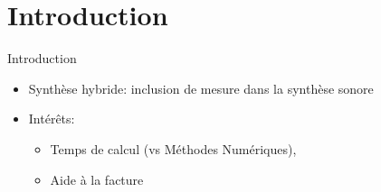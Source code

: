 \section*{Introduction}
\begin{frame}{Introduction}

\begin{itemize}
  \item Synthèse hybride: inclusion de mesure dans la synthèse sonore
  \item Intérêts: 
  \begin{itemize}
      \item Temps de calcul (vs Méthodes Numériques),
      \item Aide à la facture
  \end{itemize}
\end{itemize}

\end{frame}
